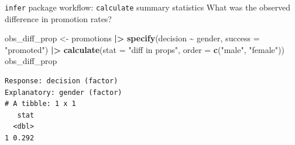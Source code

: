 \documentclass[
  ignorenonframetext,
]{beamer}
\newenvironment{Shaded}{\begin{snugshade}}{\end{snugshade}}
\newcommand{\AttributeTok}[1]{\textcolor[rgb]{0.13,0.29,0.53}{#1}}
\newcommand{\FunctionTok}[1]{\textcolor[rgb]{0.13,0.29,0.53}{\textbf{#1}}}
\newcommand{\NormalTok}[1]{#1}
\newcommand{\OtherTok}[1]{\textcolor[rgb]{0.56,0.35,0.01}{#1}}
\newcommand{\SpecialCharTok}[1]{\textcolor[rgb]{0.81,0.36,0.00}{\textbf{#1}}}
\newcommand{\StringTok}[1]{\textcolor[rgb]{0.31,0.60,0.02}{#1}}
\begin{document}
\begin{frame}[fragile]{\texttt{infer} package workflow:
\texttt{calculate} summary statistics}
\protect\hypertarget{infer-package-workflow-calculate-summary-statistics-2}{}
What was the observed difference in promotion rates?

\begin{Shaded}
\begin{Highlighting}[]
\NormalTok{obs\_diff\_prop }\OtherTok{\textless{}{-}}\NormalTok{ promotions }\SpecialCharTok{|\textgreater{}} 
  \FunctionTok{specify}\NormalTok{(decision }\SpecialCharTok{\textasciitilde{}}\NormalTok{ gender, }\AttributeTok{success =} \StringTok{"promoted"}\NormalTok{) }\SpecialCharTok{|\textgreater{}} 
  \FunctionTok{calculate}\NormalTok{(}\AttributeTok{stat =} \StringTok{"diff in props"}\NormalTok{, }
            \AttributeTok{order =} \FunctionTok{c}\NormalTok{(}\StringTok{"male"}\NormalTok{, }\StringTok{"female"}\NormalTok{))}
\NormalTok{obs\_diff\_prop}
\end{Highlighting}
\end{Shaded}

\begin{verbatim}
Response: decision (factor)
Explanatory: gender (factor)
# A tibble: 1 x 1
   stat
  <dbl>
1 0.292
\end{verbatim}
\end{frame}
\end{document}
